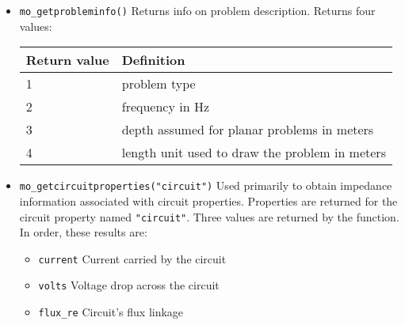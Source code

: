 \begin{itemize}
To write data instead of a plot to disk, the command would
be of the form:

\begin{tabular}{l} \verb+mo_makeplot(2,200,"c:\\temp\myfile.txt",0)+ \end{tabular}

\item \verb+mo_getprobleminfo()+
Returns info on problem description.  Returns four values:
\begin{center}
\begin{tabular}{ll} \hline
Return value & Definition \\ \hline 
1 &  problem type  \\ 
2 &  frequency in Hz \\ 
3 &  depth assumed for planar problems in meters \\
4 &  length unit used to draw the problem in meters
\end{tabular}
\end{center}

\item{\verb+mo_getcircuitproperties("circuit")+}
Used primarily to obtain impedance information associated with
circuit properties.  Properties are returned for the circuit
property named {\tt "circuit"}. Three values are returned by the
function.  In order, these results are:
\begin{itemize}
        \item{\verb+current+} Current carried by the circuit
        \item{\verb+volts+}  Voltage drop across the circuit
        \item{\verb+flux_re+} Circuit's flux linkage
        \end{itemize}

\end{itemize}


